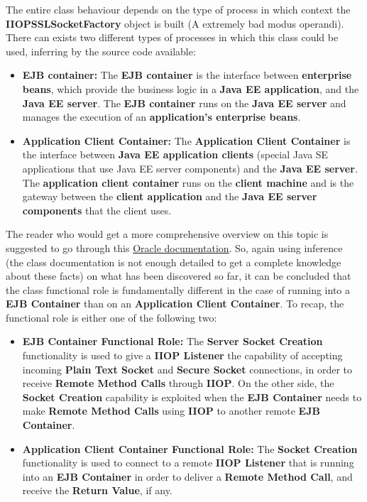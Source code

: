 \documentclass{../common/latex_classes/pdf_presentation}
\begin{document}
	\begin{frame}
		The entire class behaviour depends on the type of process in which context the \textbf{IIOPSSLSocketFactory} object is built (A extremely bad modus operandi).
		There can exists two different types of processes in which this class could be used, inferring by the source code available:
		\begin{itemize}
			\item \textbf{EJB container:}
			The \textbf{EJB container} is the interface between \textbf{enterprise beans}, which provide the business logic in a \textbf{Java EE application}, and the \textbf{Java EE server}. The \textbf{EJB container} runs on the \textbf{Java EE server} and manages the execution of an \textbf{application's enterprise beans}.
			\item \textbf{Application Client Container:}
			The \textbf{Application Client Container} is the interface between \textbf{Java EE application clients} (special Java SE applications that use Java EE server components) and the \textbf{Java EE server}. The \textbf{application client container} runs on the \textbf{client machine} and is the gateway between the \textbf{client application} and the \textbf{Java EE server components} that the client uses.
		\end{itemize}
		
		The reader who would get a more comprehensive overview on this topic is suggested to go through this \href{https://docs.oracle.com/javaee/7/firstcup/java-ee002.htm}{Oracle documentation}.
		So, again using inference (the class documentation is not enough detailed to get a complete knowledge about these facts) on what has been discovered so far, it can be concluded that the class functional role is fundamentally different in the case of running into a \textbf{EJB Container} than on an \textbf{Application Client Container}.
		To recap, the functional role is either one of the following two:
		\begin{itemize}
			\item \textbf{EJB Container Functional Role:}
			The \textbf{Server Socket Creation} functionality is used to give a \textbf{IIOP Listener} the capability of accepting incoming \textbf{Plain Text Socket} and \textbf{Secure Socket} connections, in order to receive \textbf{Remote Method Calls} through \textbf{IIOP}.
			On the other side, the \textbf{Socket Creation} capability is exploited when the \textbf{EJB Container} needs to make \textbf{Remote Method Calls} using \textbf{IIOP} to another remote \textbf{EJB Container}.
			\item \textbf{Application Client Container Functional Role:}
			The \textbf{Socket Creation} functionality is used to connect to a remote \textbf{IIOP Listener} that is running into an \textbf{EJB Container} in order to deliver a \textbf{Remote Method Call}, and receive the \textbf{Return Value}, if any.
		\end{itemize}
	\end{frame}
\end{document}
